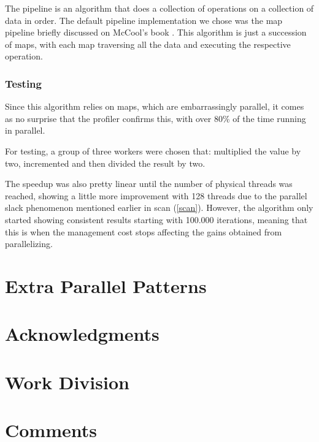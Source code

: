 \documentclass[9pt,journal]{IEEEtran}
\begin{document}
The pipeline is an algorithm that does a collection of operations on a collection of data in order. The default pipeline implementation we chose was the map pipeline briefly discussed on McCool's book \cite{mccool}. This algorithm is just a succession of maps, with each map traversing all the data and executing the respective operation.

\subsubsection{Testing}

Since this algorithm relies on maps, which are embarrassingly parallel, it comes as no surprise that the profiler confirms this, with over 80\% of the time running in parallel.

For testing, a group of three workers were chosen that: multiplied the value by two, incremented and then divided the result by two.

The speedup was also pretty linear until the number of physical threads was reached, showing a little more improvement with 128 threads due to the parallel slack phenomenon mentioned earlier in scan (\ref{scan}). However, the algorithm only started showing consistent results starting with 100.000 iterations, meaning that this is when the management cost stops affecting the gains obtained from parallelizing.

\section{Extra Parallel Patterns}

\section{Acknowledgments}


{}

\section{Work Division}

\section{Comments}
\end{document}

